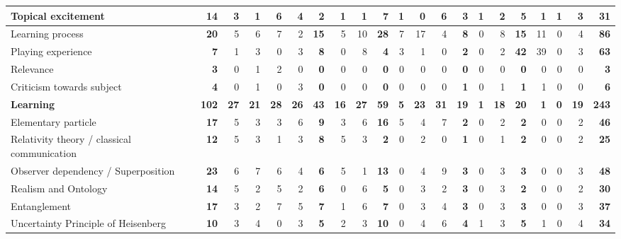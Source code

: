 \documentclass[11pt,twoside]{report} %
\begin{document}
\begin{table}
\begin{tabular}{|p{3cm}|r|r|r|r|r|r|r|r|r|r|r|r|r|r|r|r|r|r|r|r|}
Topical excitement & \textbf{14} & 3 & 1 & 6 & 4 & \textbf{2} & 1 & 1 & \textbf{7} & 1 & 0 & 6 & \textbf{3} & 1 & 2 & \textbf{5} & 1 & 1 & 3 & \textbf{31} \\ \hline
Learning process & \textbf{20} & 5 & 6 & 7 & 2 & \textbf{15} & 5 & 10 & \textbf{28} & 7 & 17 & 4 & \textbf{8} & 0 & 8 & \textbf{15} & 11 & 0 & 4 & \textbf{86} \\ \hline
Playing experience & \textbf{7} & 1 & 3 & 0 & 3 & \textbf{8} & 0 & 8 & \textbf{4} & 3 & 1 & 0 & \textbf{2} & 0 & 2 & \textbf{42} & 39 & 0 & 3 & \textbf{63} \\ \hline
Relevance & \textbf{3} & 0 & 1 & 2 & 0 & \textbf{0} & 0 & 0 & \textbf{0} & 0 & 0 & 0 & \textbf{0} & 0 & 0 & \textbf{0} & 0 & 0 & 0 & \textbf{3} \\ \hline
Criticism towards subject & \textbf{4} & 0 & 1 & 0 & 3 & \textbf{0} & 0 & 0 & \textbf{0} & 0 & 0 & 0 & \textbf{1} & 0 & 1 & \textbf{1} & 1 & 0 & 0 & \textbf{6} \\ \hline
\textbf{Learning} & \textbf{102} & \textbf{27} & \textbf{21} & \textbf{28} & \textbf{26} & \textbf{43} & \textbf{16} & \textbf{27} & \textbf{59} & \textbf{5} & \textbf{23} & \textbf{31} & \textbf{19} & \textbf{1} & \textbf{18} & \textbf{20} & \textbf{1} & \textbf{0} & \textbf{19} & \textbf{243} \\ \hline
Elementary particle & \textbf{17} & 5 & 3 & 3 & 6 & \textbf{9} & 3 & 6 & \textbf{16} & 5 & 4 & 7 & \textbf{2} & 0 & 2 & \textbf{2} & 0 & 0 & 2 & \textbf{46} \\ \hline
Relativity theory / classical communication & \textbf{12} & 5 & 3 & 1 & 3 & \textbf{8} & 5 & 3 & \textbf{2} & 0 & 2 & 0 & \textbf{1} & 0 & 1 & \textbf{2} & 0 & 0 & 2 & \textbf{25} \\ \hline
Observer dependency / Superposition & \textbf{23} & 6 & 7 & 6 & 4 & \textbf{6} & 5 & 1 & \textbf{13} & 0 & 4 & 9 & \textbf{3} & 0 & 3 & \textbf{3} & 0 & 0 & 3 & \textbf{48} \\ \hline
Realism and Ontology & \textbf{14} & 5 & 2 & 5 & 2 & \textbf{6} & 0 & 6 & \textbf{5} & 0 & 3 & 2 & \textbf{3} & 0 & 3 & \textbf{2} & 0 & 0 & 2 & \textbf{30} \\ \hline
Entanglement & \textbf{17} & 3 & 2 & 7 & 5 & \textbf{7} & 1 & 6 & \textbf{7} & 0 & 3 & 4 & \textbf{3} & 0 & 3 & \textbf{3} & 0 & 0 & 3 & \textbf{37} \\ \hline
Uncertainty Principle of Heisenberg & \textbf{10} & 3 & 4 & 0 & 3 & \textbf{5} & 2 & 3 & \textbf{10} & 0 & 4 & 6 & \textbf{4} & 1 & 3 & \textbf{5} & 1 & 0 & 4 & \textbf{34} \\ \hline

\end{tabular}
\end{table}
\end{document}
